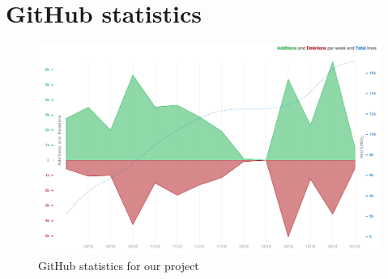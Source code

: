 \section{GitHub statistics}    
\begin{figure}[H]\centering
\includegraphics[scale=0.6, angle=90]{images/appendix/github_stats}
\caption{GitHub statistics for our project}
\end{figure}